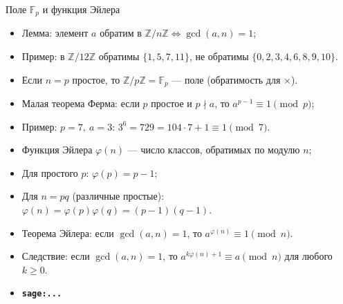 \documentclass[serif, aspectratio=169]{beamer}
\newcommand{\sagemark}{%
  \textcolor{green!40!black}{\textbf{\texttt{sage:...}}}%
}
\begin{document}
\begin{frame}{Поле $\mathbb{F}_p$ и функция Эйлера}
    \begin{itemize}
        \item Лемма: элемент $a$ обратим в $\mathbb{Z}/n\mathbb{Z} \Leftrightarrow \gcd(a,n)=1$;
        \item Пример: в $\mathbb{Z}/12\mathbb{Z}$ обратимы $\{1,5,7,11\}$, не обратимы $\{0,2,3,4,6,8,9,10\}$.
        \item Если $n=p$ простое, то $\mathbb{Z}/p\mathbb{Z} = \mathbb{F}_p$ --- поле (обратимость для $\times$).
        \item Малая теорема Ферма: если $p$ простое и $p \nmid a$, то $a^{p-1} \equiv 1 \pmod p$;
        \item Пример: $p=7,\ a=3$: $3^6 = 729 = 104\cdot7+1 \equiv 1\pmod7$.
        \item Функция Эйлера $\varphi(n)$ --- число классов, обратимых по модулю $n$;
        \item Для простого $p$: $\varphi(p)=p-1$;
        \item Для $n=pq$ (различные простые): $\varphi(n)=\varphi(p)\varphi(q)=(p-1)(q-1)$.
        \item Теорема Эйлера: если $\gcd(a,n)=1$, то $a^{\varphi(n)} \equiv 1 \pmod n$.
        \item Следствие: если $\gcd(a,n)=1$, то $a^{k\varphi(n)+1} \equiv a \pmod n$ для любого $k\ge0$.
        \item \sagemark
    \end{itemize}
\end{frame}
\end{document}
